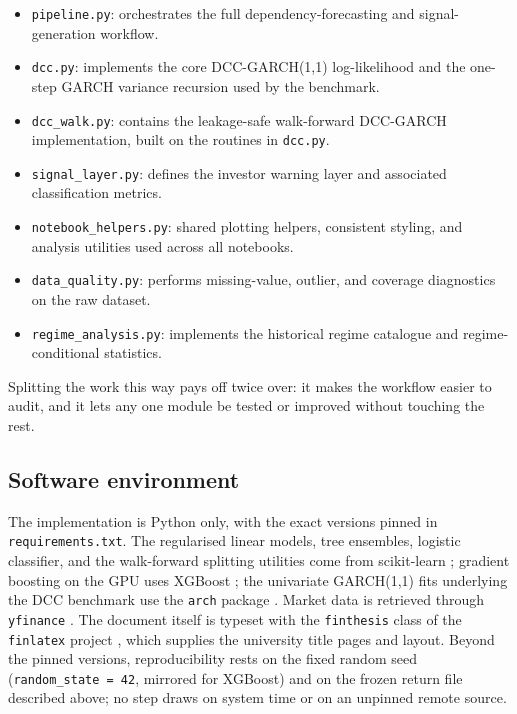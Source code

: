 \begin{itemize}
    \item \texttt{pipeline.py}: orchestrates the full dependency-forecasting and signal-generation workflow.
    \item \texttt{dcc.py}: implements the core DCC-GARCH(1,1) log-likelihood and the one-step GARCH variance recursion used by the benchmark.
    \item \texttt{dcc\_walk.py}: contains the leakage-safe walk-forward DCC-GARCH implementation, built on the routines in \texttt{dcc.py}.
    \item \texttt{signal\_layer.py}: defines the investor warning layer and associated classification metrics.
    \item \texttt{notebook\_helpers.py}: shared plotting helpers, consistent styling, and analysis utilities used across all notebooks.
    \item \texttt{data\_quality.py}: performs missing-value, outlier, and coverage diagnostics on the raw dataset.
    \item \texttt{regime\_analysis.py}: implements the historical regime catalogue and regime-conditional statistics.
\end{itemize}

Splitting the work this way pays off twice over: it makes the workflow easier to audit, and it lets any one module be tested or improved without touching the rest.

\subsection{Software environment}

The implementation is Python only, with the exact versions pinned in \texttt{requirements.txt}. The regularised linear models, tree ensembles, logistic classifier, and the walk-forward splitting utilities come from scikit-learn \cite{sklearn2026}; gradient boosting on the GPU uses XGBoost \cite{xgboostdocs2026}; the univariate GARCH(1,1) fits underlying the DCC benchmark use the \texttt{arch} package \cite{archdocs2026}. Market data is retrieved through \texttt{yfinance} \cite{yfinance2026}. The document itself is typeset with the \texttt{finthesis} class of the \texttt{finlatex} project \cite{finlatex2026}, which supplies the university title pages and layout. Beyond the pinned versions, reproducibility rests on the fixed random seed (\texttt{random\_state = 42}, mirrored for XGBoost) and on the frozen return file described above; no step draws on system time or on an unpinned remote source.

